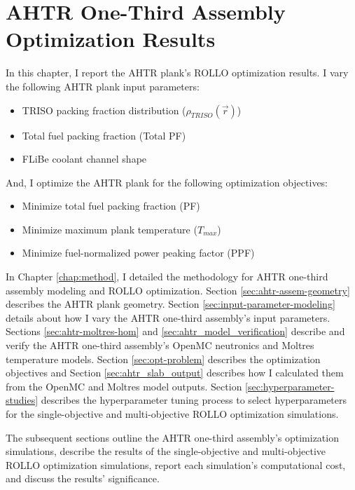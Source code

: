 \chapter{AHTR One-Third Assembly Optimization Results}
\glsresetall
\label{chap:ahtr-assem-opt-results}
In this chapter, I report the \gls{AHTR} plank's \gls{ROLLO} optimization results. 
I vary the following \gls{AHTR} plank input parameters:
\begin{itemize}
    \item \gls{TRISO} packing fraction distribution ($\rho_{TRISO}(\vec{r})$)
    \item Total fuel packing fraction (Total PF)
    \item \gls{FLiBe} coolant channel shape
\end{itemize} 
And, I optimize the \gls{AHTR} plank for the following optimization objectives:
\begin{itemize}
    \item Minimize total fuel packing fraction (PF)
    \item Minimize maximum plank temperature ($T_{max}$)
    \item Minimize fuel-normalized power peaking factor (PPF)
\end{itemize} 
 
In Chapter \ref{chap:method}, I detailed the methodology for \gls{AHTR} one-third 
assembly modeling and \gls{ROLLO} optimization. 
Section \ref{sec:ahtr-assem-geometry} describes the \gls{AHTR} plank geometry.
Section \ref{sec:input-parameter-modeling} details about how I vary the 
\gls{AHTR} one-third assembly's input parameters. 
Sections \ref{sec:ahtr-moltres-hom} and \ref{sec:ahtr_model_verification}
describe and verify the \gls{AHTR} one-third assembly's OpenMC neutronics and Moltres 
temperature models. 
Section \ref{sec:opt-problem} describes the optimization objectives and Section 
\ref{sec:ahtr_slab_output} describes how I calculated them from the OpenMC and Moltres 
model outputs. 
Section \ref{sec:hyperparameter-studies} describes the hyperparameter tuning process 
to select hyperparameters for the single-objective and multi-objective \gls{ROLLO} 
optimization simulations.

The subsequent sections outline the \gls{AHTR} one-third assembly's optimization 
simulations, describe the results of the single-objective and multi-objective 
\gls{ROLLO} optimization simulations, report each simulation's computational cost, 
and discuss the results' significance.

